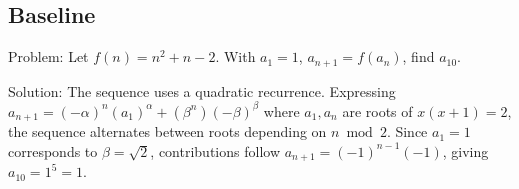 \documentclass[11pt]{article}
\begin{document}
\subsection*{Baseline}

Problem:
Let $f(n) = n^2 + n - 2$. With $a_1 = 1$, $a_{n+1} = f(a_n)$, find $a_{10}$.

Solution:
The sequence uses a quadratic recurrence. Expressing $a_{n+1}=(-\alpha)^n(a_1)^\alpha+(\beta^n)(-\beta)^\beta$ where $a_1, a_n$ are roots of $x(x+1)=2$, the sequence alternates between roots depending on $n \bmod 2$. Since $a_1=1$ corresponds to $\beta=\sqrt2$, contributions follow $a_{n+1}=(-1)^{n-1}(-1)$, giving $a_{10}=1^5=1$.
\end{document}
